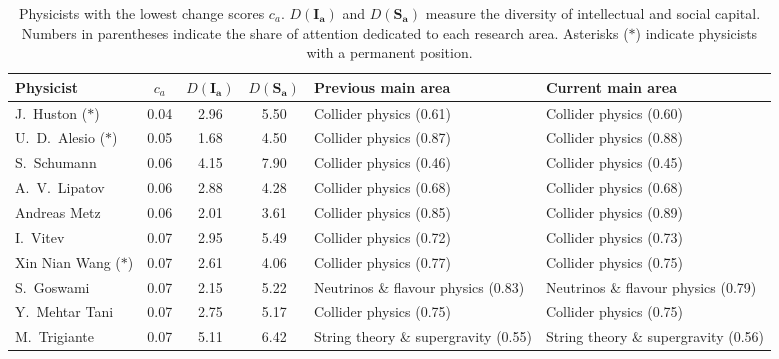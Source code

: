 \begin{table}[H]
\centering
\caption{Physicists with the lowest change scores $c_a$. $D(\bm{I_a})$ and $D(\bm{S_a})$ measure the diversity of intellectual and social capital. Numbers in parentheses indicate the share of attention dedicated to each research area. Asterisks ($\ast$) indicate physicists with a permanent position.}
\label{table:low_change}
\renewcommand{\arraystretch}{2}\fontsize{6}{7}\selectfont
\begin{tabular}{p{}|c|c|c|b{}|b{}}
\toprule
              Physicist & $c_a$ & $D(\bm{I_a})$ & $D(\bm{S_a})$ &                   Previous main area &                       Current main area \\
\midrule
     J.~Huston ($\ast$) &  0.04 &          2.96 &          5.50 &              Collider physics (0.61) &              Collider physics (0.60)\\ \hline
  U.~D.~Alesio ($\ast$) &  0.05 &          1.68 &          4.50 &              Collider physics (0.87) &              Collider physics (0.88)\\ \hline
            S.~Schumann &  0.06 &          4.15 &          7.90 &              Collider physics (0.46) &              Collider physics (0.45)\\ \hline
          A.~V.~Lipatov &  0.06 &          2.88 &          4.28 &              Collider physics (0.68) &              Collider physics (0.68)\\ \hline
           Andreas Metz &  0.06 &          2.01 &          3.61 &              Collider physics (0.85) &              Collider physics (0.89)\\ \hline
               I.~Vitev &  0.07 &          2.95 &          5.49 &              Collider physics (0.72) &              Collider physics (0.73)\\ \hline
 Xin Nian Wang ($\ast$) &  0.07 &          2.61 &          4.06 &              Collider physics (0.77) &              Collider physics (0.75)\\ \hline
             S.~Goswami &  0.07 &          2.15 &          5.22 &  Neutrinos \& flavour physics (0.83) &  Neutrinos \& flavour physics (0.79)\\ \hline
         Y.~Mehtar Tani &  0.07 &          2.75 &          5.17 &              Collider physics (0.75) &              Collider physics (0.75)\\ \hline
           M.~Trigiante &  0.07 &          5.11 &          6.42 & String theory \& supergravity (0.55) & String theory \& supergravity (0.56)\\ \hline

\end{tabular}
\end{table}
